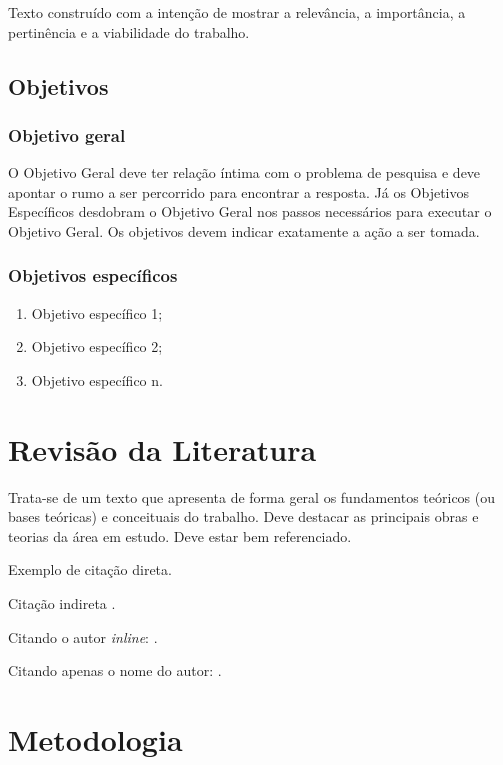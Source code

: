 \documentclass{unemat-tex}
\begin{document}
		Texto construído com a intenção de mostrar	a relevância, a importância, a pertinência e a viabilidade do trabalho.
	
	\section{Objetivos}
	
		\subsection{Objetivo geral}
		
			O Objetivo Geral deve ter relação íntima com o problema de	pesquisa e deve apontar o rumo a ser percorrido para encontrar a resposta. Já os	Objetivos Específicos desdobram o Objetivo Geral nos passos necessários para executar o	Objetivo Geral. Os objetivos devem indicar	exatamente a ação a ser tomada.
		
		\subsection{Objetivos específicos}
		
			\begin{enumerate}
				\item Objetivo específico 1;
				\item Objetivo específico 2;
				\item Objetivo específico n.
			\end{enumerate}

\chapter{Revisão da Literatura}
	
	Trata-se de um texto que apresenta de forma	geral os fundamentos teóricos (ou bases	teóricas) e conceituais do trabalho. Deve destacar as principais obras e teorias da área em estudo. Deve estar bem referenciado.
	
	\begin{citacao}
		Exemplo de citação direta. \cite{Brandao2016}
	\end{citacao}
	
	Citação indireta \cite{Brandao2016}.
	
	Citando o autor \textit{inline}: .
	
	Citando apenas o nome do autor: .
	
\chapter{Metodologia}
	
\end{document}
